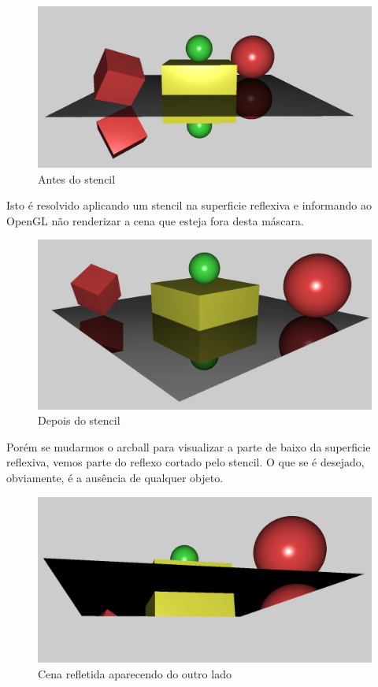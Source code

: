 \documentclass[11pt, a4paper]{article}
\begin{document}
\begin{figure}[H]
  \begin{center}
  \includegraphics[width=0.8\linewidth]{before-stencil.png}
  \caption{Antes do stencil}
  \label{fig:vaz}
  \end{center}
\end{figure}

Isto é resolvido aplicando um stencil na superficie reflexiva e informando ao 
OpenGL não renderizar a cena que esteja fora desta máscara.

\begin{figure}[H]
  \begin{center}
  \includegraphics[width=0.8\linewidth]{after-stencil.png}
  \caption{Depois do stencil}
  \label{fig:vaz}
  \end{center}
\end{figure}

Porém se mudarmos o arcball para visualizar a parte de baixo da superficie reflexiva, 
vemos parte do reflexo cortado pelo stencil. O que se é desejado, obviamente, é 
a ausência de qualquer objeto.

\begin{figure}[H]
  \begin{center}
  \includegraphics[width=0.8\linewidth]{before-cut-plan.png}
  \caption{Cena refletida aparecendo do outro lado}
  \label{fig:vaz}
  \end{center}
\end{figure}
\end{document}
